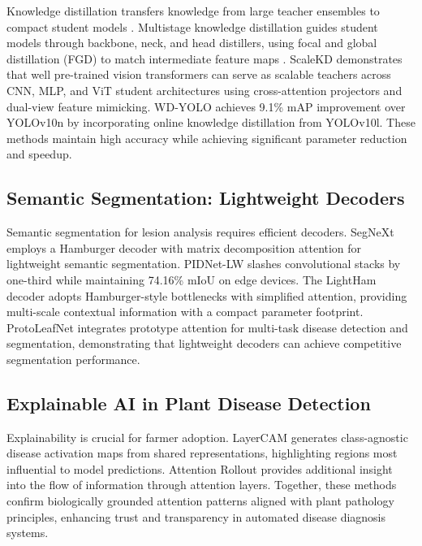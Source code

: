 \documentclass[10pt,a4paper,twocolumn]{article}
\begin{document}
Knowledge distillation transfers knowledge from large teacher ensembles to compact student models \cite{shehzadi2024knowledge}. \cite{hasan2025deployable} Multistage knowledge distillation guides student models through backbone, neck, and head distillers, using focal and global distillation (FGD) to match intermediate feature maps \cite{wang2021fgd}. ScaleKD \cite{fan2024scalekd} demonstrates that well pre-trained vision transformers can serve as scalable teachers across CNN, MLP, and ViT student architectures using cross-attention projectors and dual-view feature mimicking. WD-YOLO achieves 9.1\% mAP improvement over YOLOv10n by incorporating online knowledge distillation from YOLOv10l. These methods maintain high accuracy while achieving significant parameter reduction and speedup.

\subsection{Semantic Segmentation: Lightweight Decoders}

Semantic segmentation for lesion analysis requires efficient decoders. SegNeXt \cite{yu2024segnext} employs a Hamburger decoder with matrix decomposition attention for lightweight semantic segmentation. PIDNet-LW slashes convolutional stacks by one-third while maintaining 74.16\% mIoU on edge devices. The LightHam decoder adopts Hamburger-style bottlenecks with simplified attention, providing multi-scale contextual information with a compact parameter footprint. \cite{yu2024semantic} ProtoLeafNet \cite{fu2025protoleafnet} integrates prototype attention for multi-task disease detection and segmentation, demonstrating that lightweight decoders can achieve competitive segmentation performance.

\subsection{Explainable AI in Plant Disease Detection}

Explainability is crucial for farmer adoption. LayerCAM generates class-agnostic disease activation maps from shared representations, highlighting regions most influential to model predictions. Attention Rollout provides additional insight into the flow of information through attention layers. Together, these methods confirm biologically grounded attention patterns aligned with plant pathology principles, enhancing trust and transparency in automated disease diagnosis systems.
\end{document}
